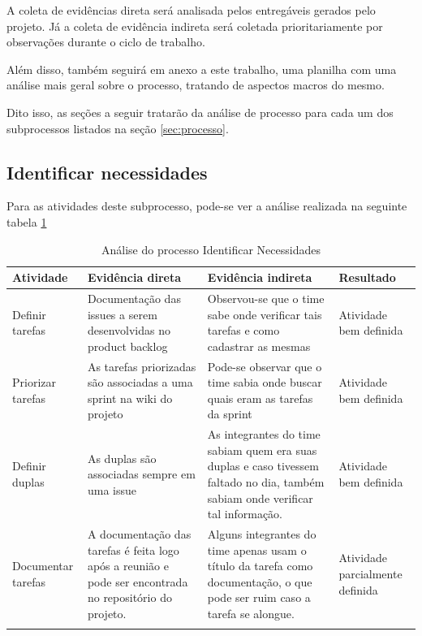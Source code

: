 \documentclass[a4paper, 11pt]{article}
\begin{document}
A coleta de evidências direta será analisada pelos entregáveis gerados pelo
projeto. Já a coleta de evidência indireta será coletada prioritariamente por
observações durante o ciclo de trabalho.

Além disso, também seguirá em anexo a este trabalho, uma planilha com uma
análise mais geral sobre o processo, tratando de aspectos macros do mesmo.

Dito isso, as seções a seguir tratarão da análise de processo para cada um dos
subprocessos listados na seção \ref{sec:processo}.

\subsection*{Identificar necessidades}

Para as atividades deste subprocesso, pode-se ver a análise realizada na
seguinte tabela \ref{tab:necessidades}

\begin{table}[]
\centering
\caption{Análise do processo Identificar Necessidades}
\begin{tabularx}{\textwidth}{|X|X|X|X|}
\hline
Atividade & Evidência direta & Evidência indireta & Resultado \\ \hline
\multicolumn{1}{|l|}{Definir tarefas} & Documentação das issues a serem desenvolvidas no product backlog & Observou-se que o time sabe onde verificar tais tarefas e como cadastrar as mesmas & Atividade bem definida \\ \hline
\multicolumn{1}{|l|}{Priorizar tarefas} & As tarefas priorizadas são associadas a uma sprint na wiki do projeto & Pode-se observar que o time sabia onde buscar quais eram as tarefas da sprint & Atividade bem definida \\ \hline
\multicolumn{1}{|l|}{Definir duplas} & As duplas são associadas sempre em uma issue & As integrantes do time sabiam quem era suas duplas e caso tivessem faltado no dia, também sabiam onde verificar tal informação. & Atividade bem definida \\ \hline
\multicolumn{1}{|l|}{Documentar tarefas} & A documentação das tarefas é feita logo após a reunião e pode ser encontrada no repositório do projeto. & Alguns integrantes do time apenas usam o título da tarefa como documentação, o que pode ser ruim caso a tarefa se alongue. & Atividade parcialmente definida \\ \hline
\label{tab:necessidades}
\end{tabularx}
\end{table}
\end{document}
